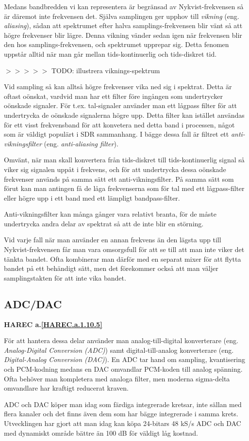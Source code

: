 Medans bandbredden vi kan representera är begränsad av Nykvist-frekvensen så
är däremot inte frekvensen det. Själva samplingen ger upphov till
\emph{vikning} (eng. \emph{aliasing}),
sådan att spektrumet efter halva samplings-frekvensen blir vänt så att högre
frekvenser blir lägre. Denna vikning vänder sedan igen när frekvensen blir
den hos samplings-frekvensen, och spektrumet upprepar sig. Detta fenomen
uppstår alltid när man går mellan tids-kontinuerlig och tids-diskret tid.

$>>>>>$ TODO: illustrera viknings-spektrum

Vid sampling så kan alltså högre frekvenser vika ned sig i spektrat. Detta är
oftast oönskat, vardvid man har ett filter före ingången som undertrycker
oönskade signaler. För t.ex. tal-signaler använder man ett lågpass filter för
att undertrycka de oönskade signalerna högre upp. Detta filter kan istället
användas för ett visst frekvensband för att konvetera ned detta band i
processen, något som är väldigt populärt i SDR sammanhang. I bägge dessa fall
är filtret ett \emph{anti-vikningsfilter} (eng. \emph{anti-aliasing filter}).

Omvänt, när man skall konvertera från tids-diskret till tids-kontinuerlig
signal så viker sig signalen uppåt i frekvens, och för att undertrycka dessa
oönskade frekvenser används på samma sätt ett anti-vikningsfilter. På samma
sätt som förut kan man antingen få de låga frekvenserna som för tal med ett
lågpass-filter eller högre upp i ett band med ett lämpligt bandpass-filter.

Anti-vikningsfilter kan många gånger vara relativt branta, för de måste
undertrycka andra delar av spektrat så att de inte blir en störning.

Vid varje fall när man använder en annan frekvens än den lägsta upp till
Nykvist-frekvensen får man vara omsorgsfull för att se till att man inte viker
det tänkta bandet. Ofta kombinerar man därför med en separat mixer för att
flytta bandet på ett behändigt sätt, men det förekommer också att man väljer
samplingstakten för att inte vika bandet.

\subsection{ADC/DAC}
\textbf{HAREC a.\ref{HAREC.a.1.10.5}\label{myHAREC.a.1.10.5}}

För att hantera dessa delar använder man analog-till-digital konverterare
(eng. \emph{Analog-Digital Conversion (ADC)}) samt digital-till-analog
konverterare (eng. \emph{Digital-Analog Conversion (DAC)}). En ADC tar hand om
sampling, kvantisering och PCM-kodning medans en DAC omvandlar PCM-koden till
analog spänning. Ofta behöver man kompletera med analoga filter, men moderna
sigma-delta omvandlare har kraftigt reducerat kraven.

ADC och DAC köper man idag som färdiga integrerade kretsar, inte sällan med
flera kanaler och det finns även dem som har bägge integrerade i samma krets.
Utvecklingen har gjort att man idag kan köpa 24-bitars 48 kS/s ADC och DAC med
dynamiskt område bättre än 100 dB för väldigt låg kostnad.
